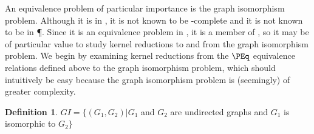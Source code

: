 \documentclass[draft]{article}
\theoremstyle{definition}
\newtheorem{definition}{Definition}%
\begin{document}
An equivalence problem of particular importance is the graph isomorphism
problem. Although it is in \NP, it is not known to be \NP-complete and it is
not known to be in \P. Since it is an equivalence problem in \NP, it is a
member of \NPEq, so it may be of particular value to study kernel reductions to
and from the graph isomorphism problem. We begin by examining kernel reductions
from the $\PEq$ equivalence relations defined above to the graph isomorphism
problem, which should intuitively be easy because the graph isomorphism problem
is (seemingly) of greater complexity.

\begin{definition}
  $GI=\{(G_1, G_2)|G_1$ and $G_2$ are undirected graphs and $G_1$ is isomorphic
  to $G_2\}$
\end{definition}
\end{document}
